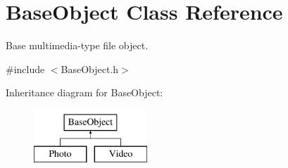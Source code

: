 \hypertarget{classBaseObject}{\section{Base\-Object Class Reference}
\label{classBaseObject}
}


Base multimedia-\/type file object.  




{\ttfamily \#include $<$Base\-Object.\-h$>$}

Inheritance diagram for Base\-Object\-:\begin{figure}[H]
\begin{center}
\leavevmode
\includegraphics[height=2.000000cm]{classBaseObject}
\end{center}
\end{figure}
